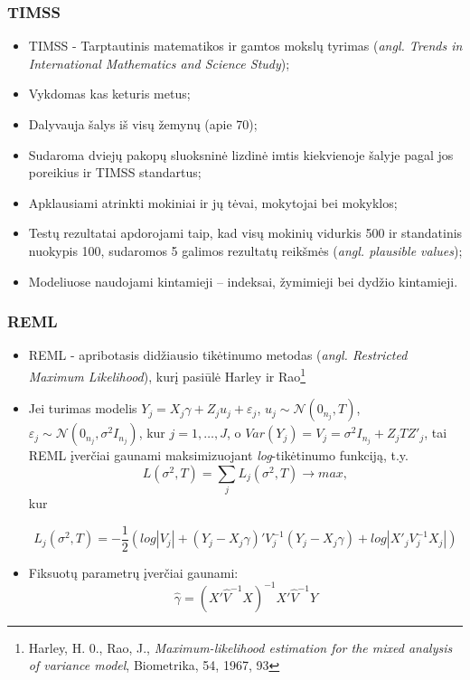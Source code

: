 \documentclass[utf8,hyperref={unicode,pdftex}]{beamer}
\begin{document}
\begin{frame}
\frametitle{TIMSS}
\begin{itemize}
\item TIMSS - Tarptautinis matematikos ir gamtos mokslų tyrimas (\textit{angl. Trends in International Mathematics and Science Study});
\item Vykdomas kas keturis metus;
\item Dalyvauja šalys iš visų žemynų (apie 70);
\item Sudaroma dviejų pakopų sluoksninė lizdinė imtis kiekvienoje šalyje pagal jos poreikius ir TIMSS standartus;
\item Apklausiami atrinkti mokiniai ir jų tėvai, mokytojai bei mokyklos;
\item Testų rezultatai apdorojami taip, kad visų mokinių vidurkis 500 ir standatinis nuokypis 100, sudaromos 5 galimos rezultatų reikšmės (\textit{angl. plausible values});
\item Modeliuose naudojami kintamieji -- indeksai, žymimieji bei dydžio kintamieji.
\end{itemize}
\end{frame}
\begin{frame}
\frametitle{REML}
\begin{itemize}
\item REML - apribotasis didžiausio tikėtinumo metodas (\textit{angl. Restricted Maximum Likelihood}), kurį pasiūlė Harley ir Rao\footnote{Harley, H. 0., Rao, J., \textit{Maximum-likelihood estimation for the mixed analysis of variance model}, Biometrika, 54, 1967, 93}\\
\item Jei turimas modelis $Y_j=X_j\gamma+Z_ju_j+\varepsilon_j$, $u_j\sim \mathcal{N}(0_{n_j}, T)$, $\varepsilon_j\sim \mathcal{N}(0_{n_j}, \sigma^2 I_{n_j})$, kur $j=1,\dots,J$, o $Var(Y_j)=V_j=\sigma^2 I_{n_j} + Z_jTZ'_j$, tai REML įverčiai gaunami maksimizuojant \textit{log}-tikėtinumo funkciją, t.y.
\[
L(\sigma^2, T)=\sum_j L_j(\sigma^2, T) \to max,
\]
kur
\begin{small}
\[
L_j(\sigma^2, T)=-\frac{1}{2}\left( log|V_j|+(Y_j-X_j\gamma)'V_j^{-1}(Y_j-X_j\gamma)+log|X'_jV_j^{-1}X_j|\right)
\]
\end{small}
\item Fiksuotų parametrų įverčiai gaunami:
\[\hat{\gamma}=(X'\hat{V}^{-1}X)^{-1}X'\hat{V}^{-1}Y\]
\end{itemize}
\end{frame}
\end{document}
